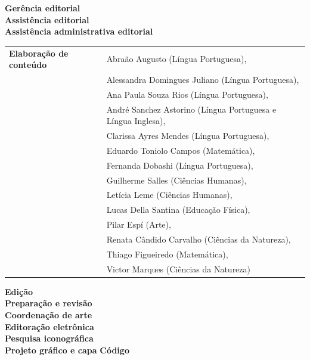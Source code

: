 \newcommand{\linha}[2]{\ifdef{#2}{\linhalayout{#1}{#2}}{}}

\begingroup\tiny
\parindent=0cm
\thispagestyle{empty}

\textbf{Gerência editorial}\\
\textbf{Assistência editorial}\\
\textbf{Assistência administrativa editorial}\\

\hspace{-5pt}\begin{tabular}{ll}
\textbf{Elaboração de conteúdo} & Abraão Augusto (Língua Portuguesa),	\\
								& Alessandra Domingues Juliano (Língua Portuguesa),	\\
								& Ana Paula Souza Rios (Língua Portuguesa),	\\
								& André Sanchez Astorino (Língua Portuguesa e Língua Inglesa),	\\
								& Clarissa Ayres Mendes (Língua Portuguesa),	\\
								& Eduardo Toniolo Campos (Matemática),	\\
								& Fernanda Dobashi (Língua Portuguesa),	\\
								& Guilherme Salles (Ciências Humanas),	\\
								& Letícia Leme (Ciências Humanas),	\\
								& Lucas Della Santina (Educação Física),	\\
								& Pilar Espí (Arte),	\\
								& Renata Cândido Carvalho (Ciências da Natureza),	\\
								& Thiago Figueiredo (Matemática),	\\
								& Victor Marques (Ciências da Natureza)	\\
\end{tabular}


\textbf{Edição}\\
\textbf{Preparação e revisão}\\
\textbf{Coordenação de arte}\\
\textbf{Editoração eletrônica}\\
\textbf{Pesquisa iconográfica}\\
\textbf{Projeto gráfico e capa}
\textbf{Código}

